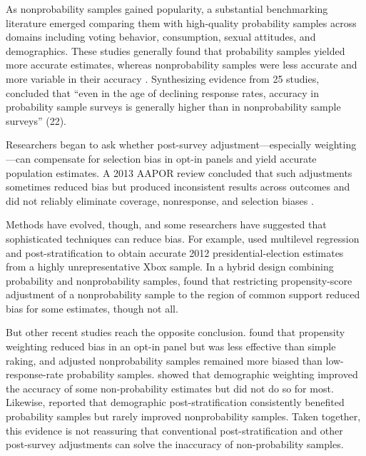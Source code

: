 \documentclass[12pt]{article}
\begin{document}
As nonprobability samples gained popularity, a substantial benchmarking literature emerged comparing them with high-quality probability samples across domains including voting behavior, consumption, sexual attitudes, and demographics. These studies generally found that probability samples yielded more accurate estimates, whereas nonprobability samples were less accurate and more variable in their accuracy \parencite[e.g.,][]{chang_national_2009, yeager_comparing_2011, szolnoki_online_2013, erens_nonprobability_2014, dutwin_apples_2017, macinnis_accuracy_2018, sturgis_assessment_2018}. Synthesizing evidence from 25 studies, \textcite{cornesse_review_2020} concluded that ``even in the age of declining response rates, accuracy in probability sample surveys is generally higher than in nonprobability sample surveys'' (22).

Researchers began to ask whether post-survey adjustment—especially weighting—can compensate for selection bias in opt-in panels and yield accurate population estimates. A 2013 AAPOR review concluded that such adjustments sometimes reduced bias but produced inconsistent results across outcomes and did not reliably eliminate coverage, nonresponse, and selection biases \parencite{baker_report_2013}.

Methods have evolved, though, and some researchers have suggested that sophisticated techniques can reduce bias. For example, \textcite{wang_forecasting_2015} used multilevel regression and post-stratification to obtain accurate 2012 presidential-election estimates from a highly unrepresentative Xbox sample. In a hybrid design combining probability and nonprobability samples, \textcite{dever_combining_2018} found that restricting propensity-score adjustment of a nonprobability sample to the region of common support reduced bias for some estimates, though not all.

But other recent studies reach the opposite conclusion. \textcite{dutwin_apples_2017} found that propensity weighting reduced bias in an opt-in panel but was less effective than simple raking, and adjusted nonprobability samples remained more biased than low-response-rate probability samples. \textcite{yeager_comparing_2011} showed that  demographic weighting improved the accuracy of some non-probability estimates but did not do so for most. Likewise, \textcite{macinnis_accuracy_2018} reported that demographic post-stratification consistently benefited probability samples but rarely improved nonprobability samples. Taken together, this evidence is not reassuring that conventional post-stratification and other post-survey adjustments can solve the inaccuracy of non-probability samples. 
\end{document}

